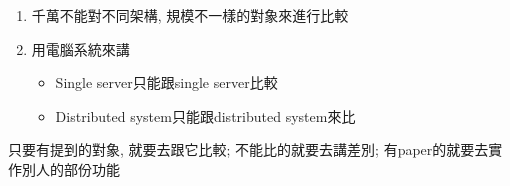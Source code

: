 
\begin{enumerate}
  \item
  {
    千萬不能對不同架構, 規模不一樣的對象來進行比較
  } %

  \item
  {
    用電腦系統來講
    \begin{itemize}
      \item
      {
        Single server只能跟single server比較
      } %

      \item
      {
        Distributed system只能跟distributed system來比
      } %
    \end{itemize}
  } %
\end{enumerate}


只要有提到的對象, 就要去跟它比較; 不能比的就要去講差別; 有paper的就要去實作別人的部份功能


